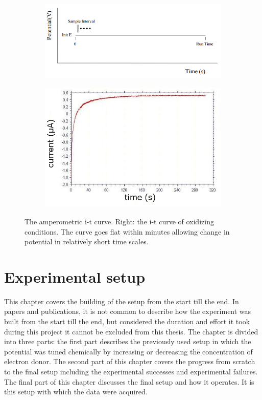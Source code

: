 \documentclass[twoside,single]{lion-msc}
\begin{document}
\begin{figure}[ht!]
\begin{subfigure}{.5\textwidth}
  \centering
  \includegraphics[width= \textwidth]{amp_curve}

  \label{}
\end{subfigure}%
\begin{subfigure}{.5\textwidth}
  \centering
  \includegraphics[width=.95 \linewidth]{it100mV}
  \label{}
\end{subfigure}
\caption{The amperometric i-t curve.  Right: the i-t curve of oxidizing conditions. The curve goes flat within minutes allowing change in potential in relatively short time scales.}
\label{amp_curve}
\end{figure}



\chapter{Experimental setup}

This chapter covers the building of the setup from the start till the end. In papers and publications, it is not  common to describe how the experiment was built from the start till the end, but considered the duration and effort it took during this project it cannot be excluded from this thesis. The chapter is divided into three parts: the first part describes the previously used setup in which the potential was tuned chemically by increasing or decreasing the concentration of  electron donor. The second part of this chapter covers the progress from scratch to the final setup including the experimental successes and experimental failures. The final part of this chapter discusses the final setup and how it operates. It is this setup with which the data were acquired.
\end{document}
